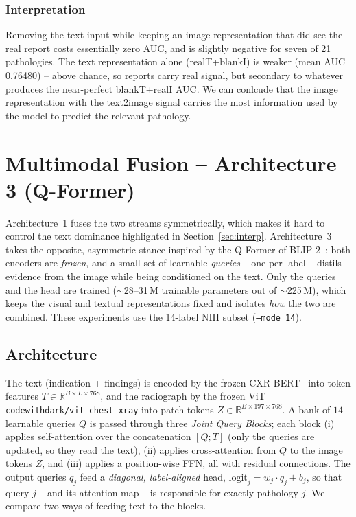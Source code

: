 \documentclass[11pt]{article}
\begin{document}
\subsubsection{Interpretation}

Removing the text input while keeping an image representation that did see the real report costs essentially zero AUC, and is slightly negative for seven of 21 pathologies. The text representation alone (realT+blankI) is weaker (mean AUC 0.76480) -- above chance, so reports carry real signal, but secondary to whatever produces the near-perfect blankT+realI AUC.
We can conlcude that the image representation with the text2image signal carries the most information used by the model to predict the relevant pathology.

\section{Multimodal Fusion -- Architecture 3 (Q-Former)}
\label{sec:qformer}

Architecture~1 fuses the two streams symmetrically, which makes it hard to control
the text dominance highlighted in Section~\ref{sec:interp}. Architecture~3 takes the
opposite, asymmetric stance inspired by the Q-Former of BLIP-2~\cite{blip2}: both
encoders are \emph{frozen}, and a small set of learnable \emph{queries} -- one per
label -- distils evidence from the image while being conditioned on the text. Only
the queries and the head are trained ($\sim$28--31\,M trainable parameters out of
$\sim$225\,M), which keeps the visual and textual representations fixed and isolates
\emph{how} the two are combined. These experiments use the 14-label NIH subset
(\texttt{--mode 14}).

\subsection{Architecture}

The text (indication + findings) is encoded by the frozen
CXR-BERT~\cite{cxrbert} into token features $T\in\mathbb{R}^{B\times L\times 768}$, and
the radiograph by the frozen ViT~\cite{vit} \texttt{codewithdark/vit-chest-xray} into
patch tokens $Z\in\mathbb{R}^{B\times 197\times 768}$. A bank of $14$ learnable queries
$Q$ is passed through three \emph{Joint Query Blocks}; each block (i) applies
self-attention over the concatenation $[Q;T]$ (only the queries are updated, so they
read the text), (ii) applies cross-attention from $Q$ to the image tokens $Z$, and
(iii) applies a position-wise FFN, all with residual connections. The output queries
$q_j$ feed a \emph{diagonal, label-aligned} head, $\text{logit}_j = w_j\!\cdot\! q_j +
b_j$, so that query $j$ -- and its attention map -- is responsible for exactly
pathology $j$. We compare two ways of feeding text to the blocks.
\end{document}

